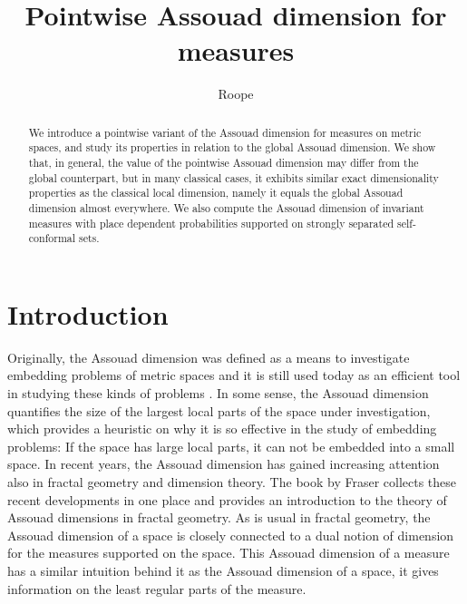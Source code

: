 \documentclass{PRM}
\theoremstyle{plain}
\theoremstyle{definition}
\theoremstyle{remark}
\begin{document}
\title{Pointwise Assouad dimension for measures}

\author{Roope }

\address{Research Unit of Mathematical Sciences\\  P.O.Box 8000, FI-90014, University of Oulu, Finland }

\begin{abstract}
    We introduce a pointwise variant of the Assouad dimension for measures on metric spaces, and study its properties in relation to the global Assouad dimension. We show that, in general, the value of the pointwise Assouad dimension may differ from the global counterpart, but in many classical cases, it exhibits similar exact dimensionality properties as the classical local dimension, namely it equals the global Assouad dimension almost everywhere. We also compute the Assouad dimension of invariant measures with place dependent probabilities supported on strongly separated self-conformal sets. 
\end{abstract}




\maketitle

\section{Introduction}
Originally, the Assouad dimension was defined as a means to investigate embedding problems of metric spaces \cite{A} and it is still used today as an efficient tool in studying these kinds of problems \cite{T}. In some sense, the Assouad dimension quantifies the size of the largest local parts of the space under investigation, which provides a heuristic on why it is so effective in the study of embedding problems: If the space has large local parts, it can not be embedded into a small space. In recent years, the Assouad dimension has gained increasing attention also in fractal geometry and dimension theory. The book by Fraser \cite{F} collects these recent developments in one place and provides an introduction to the theory of Assouad dimensions in fractal geometry. As is usual in fractal geometry, the Assouad dimension of a space is closely connected to a dual notion of dimension for the measures supported on the space. This Assouad dimension of a measure has a similar intuition behind it as the Assouad dimension of a space, it gives information on the least regular parts of the measure.
\end{document}
